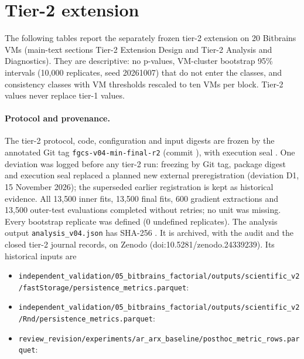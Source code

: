 \clearpage
\section*{Tier-2 extension}
The following tables report the separately frozen tier-2 extension on 20 Bitbrains VMs (main-text sections Tier-2 Extension Design and Tier-2 Analysis and Diagnostics). They are descriptive: no p-values, VM-cluster bootstrap 95\% intervals (10{,}000 replicates, seed 20261007) that do not enter the classes, and consistency classes with VM thresholds rescaled to ten VMs per block. Tier-2 values never replace tier-1 values.

\paragraph{Protocol and provenance.} The tier-2 protocol, code, configuration and input digests are frozen by the annotated Git tag \texttt{fgcs-v04-min-final-r2} (commit \texttt{}), with execution seal \texttt{}. One deviation was logged before any tier-2 run: freezing by Git tag, package digest and execution seal replaced a planned new external preregistration (deviation D1, 15 November 2026); the superseded earlier registration is kept as historical evidence. All 13{,}500 inner fits, 13{,}500 final fits, 600 gradient extractions and 13{,}500 outer-test evaluations completed without retries; no unit was missing. Every bootstrap replicate was defined (0 undefined replicates). The analysis output \texttt{analysis\_v04.json} has SHA-256 \texttt{}. It is archived, with the audit and the closed tier-2 journal records, on Zenodo (doi:10.5281/zenodo.24339239). Its historical inputs are
\begin{itemize}\footnotesize\raggedright
\item \nolinkurl{independent_validation/05_bitbrains_factorial/outputs/scientific_v2/fastStorage/persistence_metrics.parquet}:\\ \texttt{}
\item \nolinkurl{independent_validation/05_bitbrains_factorial/outputs/scientific_v2/Rnd/persistence_metrics.parquet}:\\ \texttt{}
\item \nolinkurl{review_revision/experiments/ar_arx_baseline/posthoc_metric_rows.parquet}:\\ \texttt{}
\end{itemize}

